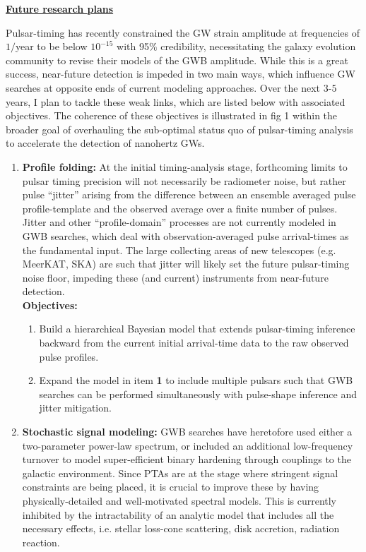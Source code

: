 \documentclass[11pt,letterpaper,sans]{moderncv} %
\begin{document}
\noindent \textbf{\underline{Future research plans}}

\noindent Pulsar-timing has recently constrained the GW strain amplitude at frequencies of $1/$year to be below $10^{-15}$ with 95$\%$ credibility, necessitating the galaxy evolution community to revise their models of the GWB amplitude. While this is a great success, near-future detection is impeded in two main ways, which influence GW searches at opposite ends of current modeling approaches. Over the next $3$-$5$ years, I plan to tackle these weak links, which are listed below with associated objectives. The coherence of these objectives is illustrated in fig 1 within the broader goal of overhauling the sub-optimal status quo of pulsar-timing analysis to accelerate the detection of nanohertz GWs.

\begin{enumerate} [label=\textbf{\Alph*}]  
\setlength\itemsep{0em}
\item \textbf{Profile folding:} At the initial timing-analysis stage, forthcoming limits to pulsar timing precision will not necessarily be radiometer noise, but rather pulse ``jitter'' arising from the difference between an ensemble averaged pulse profile-template and the observed average over a finite number of pulses. Jitter and other ``profile-domain'' processes are not currently modeled in GWB searches, which deal with observation-averaged pulse arrival-times as the fundamental input. The large collecting areas of new telescopes (e.g. MeerKAT, SKA) are such that jitter will likely set the future pulsar-timing noise floor, impeding these (and current) instruments from near-future detection. 
\\\textbf{Objectives:}
\begin{enumerate}[label=\textbf{\arabic*})] 
\setlength\itemsep{0em}
\item Build a hierarchical Bayesian model that extends pulsar-timing inference backward from the current initial arrival-time data to the raw observed pulse profiles. 
\item Expand the model in item \textbf{1} to include multiple pulsars such that GWB searches can be performed simultaneously with pulse-shape inference and jitter mitigation. 
\end{enumerate}
\item \textbf{Stochastic signal modeling:} GWB searches have heretofore used either a two-parameter power-law spectrum, or included an additional low-frequency turnover to model super-efficient binary hardening through couplings to the galactic environment. Since PTAs are at the stage where stringent signal constraints are being placed, it is crucial to improve these by having physically-detailed and well-motivated spectral models. This is currently inhibited by the intractability of an analytic model that includes all the necessary effects, i.e. stellar loss-cone scattering, disk accretion, radiation reaction.

\end{enumerate}
\end{document}
